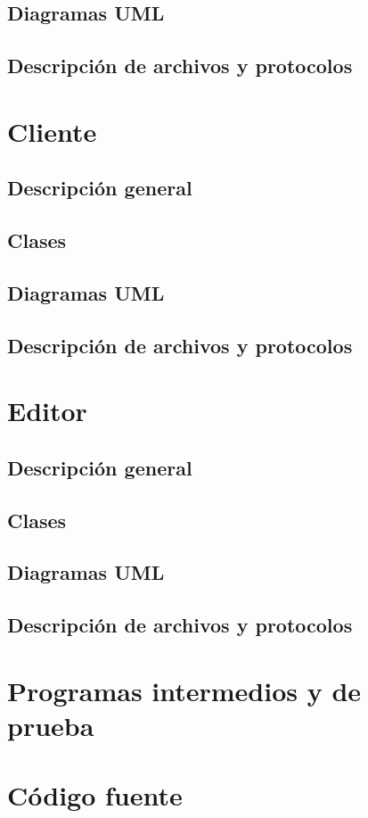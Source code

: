 \documentclass[a4paper]{article}
\begin{document}
\subsection{Diagramas UML}

\subsection{Descripción de archivos y protocolos}

\section{Cliente}

\subsection{Descripción general}

\subsection{Clases}

\subsection{Diagramas UML}

\subsection{Descripción de archivos y protocolos}

\section{Editor}

\subsection{Descripción general}

\subsection{Clases}

\subsection{Diagramas UML}

\subsection{Descripción de archivos y protocolos}

\section{Programas intermedios y de prueba}

\section{Código fuente}
\end{document}
